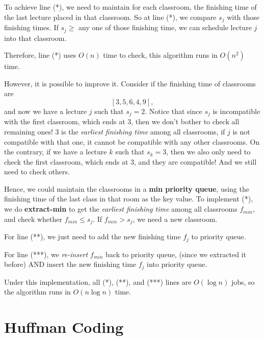 \begin{spacing}{1.3}
    To achieve line (*), we need to maintain for each classroom, the finishing time 
    of the last lecture placed in that classroom. So at line (*), we compare 
    $s_j$ with those finishing times. If $s_j\ge $ any one of those finishing time,
    we can schedule lecture $j$ into that classroom.

    Therefore, line (*) uses $O(n)$ time to check, this algorithm runs in $O(n^2)$ time.

    However, it is possible to improve it. Consider if the finishing time of 
    classrooms are
    $$[3, 5, 6, 4, 9],$$
    and now we have a lecture $j$ such that $s_j=2$. Notice that since $s_j$ is 
    incompatible with the first classroom, which ends at 3, then we don't bother 
    to check all remaining ones! 3 is the {\it earliest finishing time} among all 
    classrooms, if $j$ is not compatible with that one, it cannot be compatible
    with any other classrooms. On the contrary, if we have a lecture $k$ such that 
    $s_k=3$, then we also only need to check the first classroom, which ends at 3, 
    and they are compatible! And we still need to check others.

    Hence, we could maintain the classrooms in a {\bf min priority queue}, 
    using the finishing time of the last class in that room as the key value.
    To implement (*), we do {\bf extract-min} to get the {\it earliest finishing
    time} among all classrooms $f_{min}$, and check whether $f_{min}\le s_j$.
    If $f_{min}> s_j$, we need a new classroom.

    For line (**), we just need to add the new finishing time $f_j$ to 
    priority queue.

    For line (***), we {\it re-insert} $f_{min}$ back to priority queue,
    (since we extracted it before) AND 
    insert the new finishing time $f_j$ into priority queue.

    Under this implementation, all (*), (**), and (***) lines are $O(\log n)$
    jobs, so the algorithm runs in $O(n\log n)$ time.



    \section{Huffman Coding}


\end{spacing}
